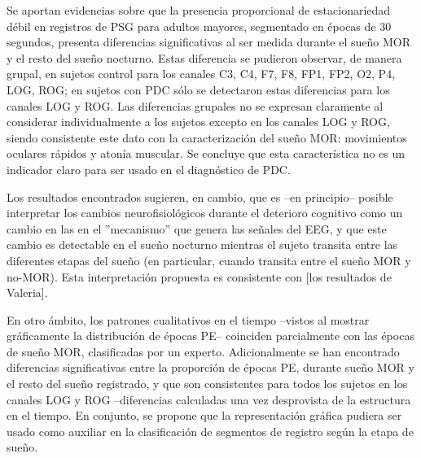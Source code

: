 \documentclass[12pt,a4paper]{mitthesis}
\begin{document}
Se aportan evidencias sobre que la presencia proporcional de estacionariedad d\'ebil en registros 
de PSG para adultos mayores, segmentado en \'epocas de 30 segundos, 
presenta diferencias significativas al ser medida durante el sue\~no MOR y el resto del sue\~no
nocturno. Estas diferencia se pudieron observar, de manera grupal, 
en sujetos control para los canales 
C3, C4, F7, F8, FP1, FP2, O2, P4, LOG, ROG; en sujetos con PDC s\'olo se detectaron estas 
diferencias para los canales LOG y ROG.
Las diferencias grupales no se expresan claramente al considerar individualmente
a los sujetos excepto en los canales LOG y ROG, siendo consistente este dato con la 
caracterizaci\'on del sue\~no MOR: movimientos oculares r\'apidos y aton\'ia muscular.
Se concluye que esta caracter\'istica no es un indicador claro para ser usado
en el diagn\'ostico de PDC.

Los resultados encontrados sugieren, en cambio, que es --en principio-- posible interpretar los
cambios neurofisiol\'ogicos durante el deterioro cognitivo como un cambio en las 
en el ''mecanismo'' que genera las se\~nales del EEG, y que este cambio es detectable en el 
sue\~no nocturno mientras el sujeto transita entre las diferentes etapas del sue\~no 
(en particular, cuando transita entre el sue\~no MOR y no-MOR).
Esta interpretaci\'on propuesta es consistente con [los resultados de Valeria].

En otro \'ambito, los
patrones cualitativos en el tiempo --vistos al
mostrar gr\'aficamente la distribuci\'on de \'epocas PE-- coinciden parcialmente con las \'epocas
de sue\~no MOR, clasificadas por un experto.
Adicionalmente se han encontrado diferencias significativas entre la proporci\'on de \'epocas PE,
durante sue\~no MOR y el resto del sue\~no registrado, y que son consistentes para todos los
sujetos en los canales LOG y ROG --diferencias calculadas una vez desprovista de la estructura
en el tiempo. En conjunto, se propone que la representaci\'on gr\'afica pudiera ser usado
como auxiliar en la clasificaci\'on de segmentos de registro seg\'un la etapa de sue\~no.
\end{document}
